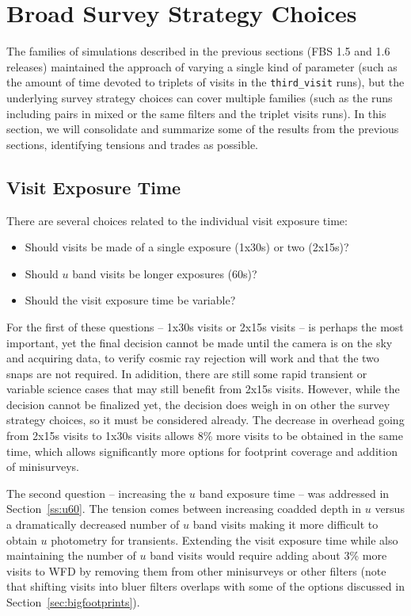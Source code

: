 \section{Broad Survey Strategy Choices}

The families of simulations described in the previous sections (FBS 1.5 and 1.6 releases) maintained the approach of varying a single kind of parameter (such as the amount of time devoted to triplets of visits in the {\tt third\_visit} runs), but the underlying survey strategy choices can cover multiple families (such as the runs including pairs in mixed or the same filters and the triplet visits runs). In this section, we will consolidate and summarize some of the results from the previous sections, identifying tensions and trades as possible. 

\subsection{Visit Exposure Time}\label{sec:visitexposuretime}

There are several choices related to the individual visit exposure time:
 \begin{itemize}
 \item Should visits be made of a single exposure (1x30s) or two (2x15s)? 
 \item Should $u$ band visits be longer exposures (60s)?
 \item Should the visit exposure time be variable?
 \end{itemize}
 
For the first of these questions -- 1x30s visits or 2x15s visits -- is perhaps the most important, yet the final decision cannot be made until the camera is on the sky and acquiring data, to verify cosmic ray rejection will work and that the two snaps are not required. In adidition, there are still some rapid transient or variable science cases that may still benefit from 2x15s visits. However, while the decision cannot be finalized yet, the decision does weigh in on other the survey strategy choices, so it must be considered already. The decrease in overhead going from 2x15s visits to 1x30s visits allows 8\% more visits to be obtained in the same time, which allows significantly more options for footprint coverage and addition of minisurveys. 

The second question -- increasing the $u$ band exposure time -- was addressed in Section~\ref{ss:u60}. The tension comes between increasing coadded depth in $u$ versus a dramatically decreased number of $u$ band visits making it more difficult to obtain $u$ photometry for transients. Extending the visit exposure time while also maintaining the number of $u$ band visits would require adding about 3\% more visits to WFD by removing them from other minisurveys or other filters (note that shifting visits into bluer filters overlaps with some of the options discussed in Section~\ref{sec:bigfootprints}). 

